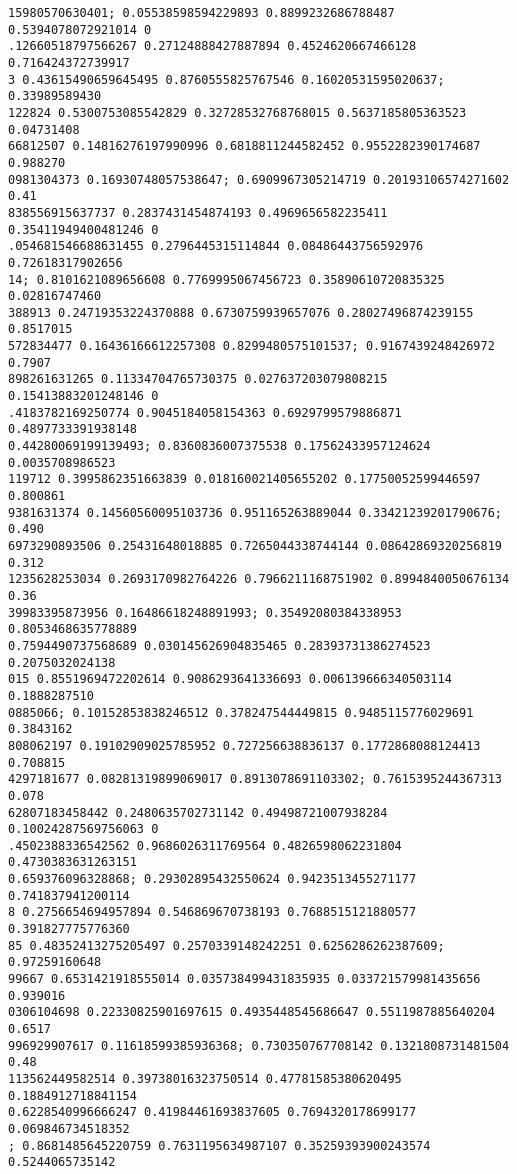 \documentclass[12pt,a4paper]{article}
\begin{document}
\begin{lstlisting}
15980570630401; 0.05538598594229893 0.8899232686788487 0.5394078072921014 0
.12660518797566267 0.27124888427887894 0.4524620667466128 0.716424372739917
3 0.43615490659645495 0.8760555825767546 0.16020531595020637; 0.33989589430
122824 0.5300753085542829 0.32728532768768015 0.5637185805363523 0.04731408
66812507 0.14816276197990996 0.6818811244582452 0.9552282390174687 0.988270
0981304373 0.16930748057538647; 0.6909967305214719 0.20193106574271602 0.41
838556915637737 0.2837431454874193 0.4969656582235411 0.35411949400481246 0
.054681546688631455 0.2796445315114844 0.08486443756592976 0.72618317902656
14; 0.8101621089656608 0.7769995067456723 0.35890610720835325 0.02816747460
388913 0.24719353224370888 0.6730759939657076 0.28027496874239155 0.8517015
572834477 0.16436166612257308 0.8299480575101537; 0.9167439248426972 0.7907
898261631265 0.11334704765730375 0.027637203079808215 0.15413883201248146 0
.4183782169250774 0.9045184058154363 0.6929799579886871 0.4897733391938148 
0.44280069199139493; 0.8360836007375538 0.17562433957124624 0.0035708986523
119712 0.3995862351663839 0.018160021405655202 0.17750052599446597 0.800861
9381631374 0.14560560095103736 0.951165263889044 0.33421239201790676; 0.490
6973290893506 0.25431648018885 0.7265044338744144 0.08642869320256819 0.312
1235628253034 0.2693170982764226 0.7966211168751902 0.8994840050676134 0.36
39983395873956 0.16486618248891993; 0.35492080384338953 0.8053468635778889 
0.7594490737568689 0.030145626904835465 0.28393731386274523 0.2075032024138
015 0.8551969472202614 0.9086293641336693 0.006139666340503114 0.1888287510
0885066; 0.10152853838246512 0.378247544449815 0.9485115776029691 0.3843162
808062197 0.19102909025785952 0.727256638836137 0.1772868088124413 0.708815
4297181677 0.08281319899069017 0.8913078691103302; 0.7615395244367313 0.078
62807183458442 0.2480635702731142 0.49498721007938284 0.10024287569756063 0
.4502388336542562 0.9686026311769564 0.4826598062231804 0.4730383631263151 
0.659376096328868; 0.29302895432550624 0.9423513455271177 0.741837941200114
8 0.2756654694957894 0.546869670738193 0.7688515121880577 0.391827775776360
85 0.48352413275205497 0.2570339148242251 0.6256286262387609; 0.97259160648
99667 0.6531421918555014 0.035738499431835935 0.033721579981435656 0.939016
0306104698 0.22330825901697615 0.4935448545686647 0.5511987885640204 0.6517
996929907617 0.11618599385936368; 0.730350767708142 0.1321808731481504 0.48
113562449582514 0.39738016323750514 0.47781585380620495 0.1884912718841154 
0.6228540996666247 0.41984461693837605 0.7694320178699177 0.069846734518352
; 0.8681485645220759 0.7631195634987107 0.35259393900243574 0.5244065735142

\end{lstlisting}
\end{document}
